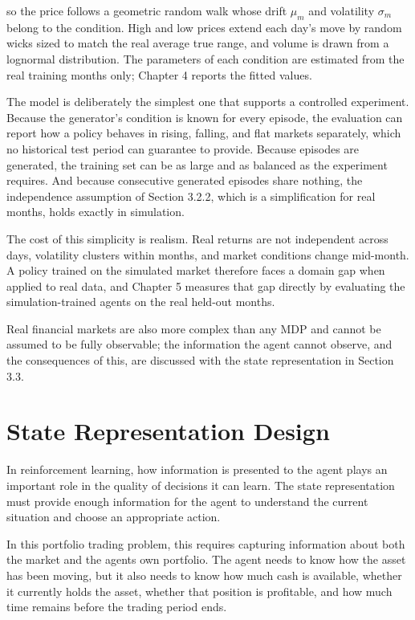 so the price follows a geometric random walk whose drift \(\mu_{m}\) and
volatility \(\sigma_{m}\) belong to the condition. High and low prices
extend each day's move by random wicks sized to match the real average
true range, and volume is drawn from a lognormal distribution. The
parameters of each condition are estimated from the real training months
only; Chapter 4 reports the fitted values.

The model is deliberately the simplest one that supports a controlled
experiment. Because the generator's condition is known for every episode,
the evaluation can report how a policy behaves in rising, falling, and
flat markets separately, which no historical test period can guarantee
to provide. Because episodes are generated, the training set can be as
large and as balanced as the experiment requires. And because
consecutive generated episodes share nothing, the independence
assumption of Section 3.2.2, which is a simplification for real months,
holds exactly in simulation.

The cost of this simplicity is realism. Real returns are not
independent across days, volatility clusters within months, and market
conditions change mid-month. A policy trained on the simulated market therefore
faces a domain gap when applied to real data, and Chapter 5 measures
that gap directly by evaluating the simulation-trained agents on the
real held-out months.

Real financial markets are also more complex than any MDP and cannot be
assumed to be fully observable; the information the agent cannot
observe, and the consequences of this, are discussed with the state
representation in Section 3.3.

\section{State Representation Design}

In reinforcement learning, how information is presented to the agent
plays an important role in the quality of decisions it can learn. The
state representation must provide enough information for the agent to
understand the current situation and choose an appropriate action.

In this portfolio trading problem, this requires capturing information
about both the market and the agent\textquotesingle s own portfolio. The
agent needs to know how the asset has been moving, but it also needs to
know how much cash is available, whether it currently holds the asset,
whether that position is profitable, and how much time remains before
the trading period ends.

